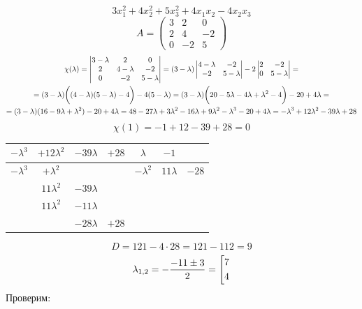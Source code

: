 $$ 3x_1^2 + 4x_2^2 + 5x_3^2 + 4x_1x_2 - 4x_2x_3 $$
$$ A =
\begin{pmatrix}
    3 & 2 & 0 \\
    2 & 4 & -2 \\
    0 & -2 & 5
\end{pmatrix} $$
\begin{multline*}
    $$ \chi(\lambda) =
    \begin{vmatrix}
        3 - \lambda & 2 & 0 \\
        2 & 4 - \lambda & -2 \\
        0 & -2 & 5 - \lambda
    \end{vmatrix} = (3 - \lambda)
    \begin{vmatrix}
        4 - \lambda & -2 \\
        -2 & 5 - \lambda
    \end{vmatrix} - 2
    \begin{vmatrix}
        2 & -2 \\
        0 & 5 - \lambda
    \end{vmatrix} = \\
    = (3 - \lambda) \bigg( (4 - \lambda)(5 - \lambda) - 4 \bigg) - 4(5 - \lambda) = (3 - \lambda) \bigg(20 - 5\lambda - 4\lambda + \lambda^2 - 4 \bigg) - 20 + 4\lambda = \\
    = (3 - \lambda)(16 - 9\lambda + \lambda^2) - 20 + 4\lambda = 48 - 27\lambda + 3\lambda^2 - 16\lambda + 9\lambda^2 - \lambda^3 - 20 + 4\lambda = -\lambda^3 + 12\lambda^2 - 39\lambda + 28
\end{multline*}
$$ \chi(1) = -1 + 12 - 39 + 28 = 0 $$
\begin{tabular}{c c c c | c c c}
	$ -\lambda^3 $ & $ + 12\lambda^2 $ & $ -39\lambda $ & $ +28 $ & $ \lambda $ & $ -1 $ \\
    \hline
    $ -\lambda^3 $ & $ + \lambda^2 $ & & & $ -\lambda^2 $ & $ 11\lambda $ & $ -28 $ \\
    \hline
    & $ 11\lambda^2 $ & $ -39\lambda $ & \\
    & $ 11\lambda^2 $ & $ -11\lambda $ & \\
    \hline
    & & $ -28\lambda $ & $ + 28 $
\end{tabular}
$$ D = 121 - 4 \cdot 28 = 121 - 112 = 9 $$
$$ \lambda_{1,2} = -\half[-11 \pm 3] = \left[
\begin{aligned}
	7 \\
    4
\end{aligned} \right. $$
Проверим:
